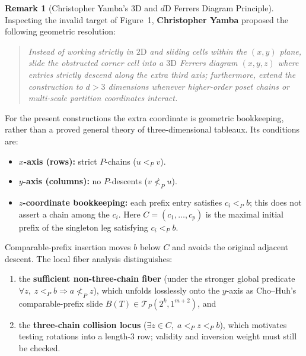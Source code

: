 \documentclass[11pt]{article}
\theoremstyle{definition}
\newtheorem{remark}[theorem]{Remark}
\newcommand{\TP}{\mathcal{T}_P}
\begin{document}
\begin{remark}[Christopher Yamba's $3\mathrm{D}$ and $d\mathrm{D}$ Ferrers Diagram Principle]
\label{rem:yamba-insight}
Inspecting the invalid target of Figure~1, \textbf{Christopher Yamba} proposed the following geometric resolution:
\begin{quote}
\emph{Instead of working strictly in $2\mathrm{D}$ and sliding cells within the $(x,y)$ plane, slide the obstructed corner cell into a $3\mathrm{D}$ Ferrers diagram $(x,y,z)$ where entries strictly descend along the extra third axis; furthermore, extend the construction to $d > 3$ dimensions whenever higher-order poset chains or multi-scale partition coordinates interact.}
\end{quote}
For the present constructions the extra coordinate is geometric bookkeeping, rather than a proved general theory of three-dimensional tableaux. Its conditions are:
\begin{itemize}
  \item \textbf{$x$-axis (rows):} strict $P$-chains ($u <_P v$).
  \item \textbf{$y$-axis (columns):} no $P$-descents ($v \not<_P u$).
  \item \textbf{$z$-coordinate bookkeeping:} each prefix entry satisfies $c_i <_P b$; this does not assert a chain among the $c_i$. Here $C = (c_1, \dots, c_p)$ is the maximal initial prefix of the singleton leg satisfying $c_i <_P b$.
\end{itemize}
Comparable-prefix insertion moves $b$ below $C$ and avoids the original adjacent descent. The local fiber analysis distinguishes:
\begin{enumerate}
  \item the \textbf{sufficient non-three-chain fiber} (under the stronger global predicate $\forall z,\;z<_P b\Rightarrow a\not<_P z$), which unfolds losslessly onto the $y$-axis as Cho--Huh's comparable-prefix slide $B(T) \in \TP(2^k, 1^{m+2})$, and
  \item the \textbf{three-chain collision locus} ($\exists z \in C,\; a <_P z <_P b$), which motivates testing rotations into a length-$3$ row; validity and inversion weight must still be checked.
\end{enumerate}
\end{remark}
\end{document}

